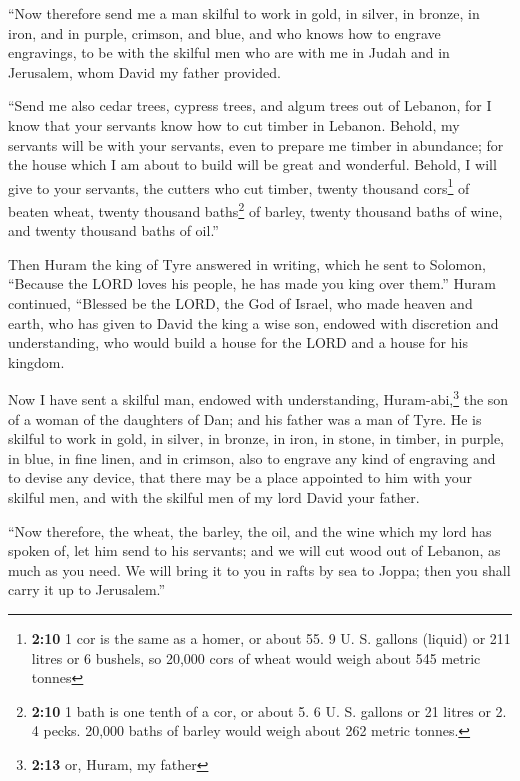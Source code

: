  ``Now therefore send me a man skilful to work in gold, in
silver, in bronze, in iron, and in purple, crimson, and blue, and who
knows how to engrave engravings, to be with the skilful men who are with
me in Judah and in Jerusalem, whom David my father provided.

 ``Send me also cedar trees, cypress trees, and algum
trees out of Lebanon, for I know that your servants know how to cut
timber in Lebanon. Behold, my servants will be with your servants,
 even to prepare me timber in abundance; for the house
which I am about to build will be great and wonderful. 
Behold, I will give to your servants, the cutters who cut timber, twenty
thousand cors\footnote{\textbf{2:10} 1 cor is the same as a homer, or
  about 55. 9 U. S. gallons (liquid) or 211 litres or 6 bushels, so
  20,000 cors of wheat would weigh about 545 metric tonnes} of beaten
wheat, twenty thousand baths\footnote{\textbf{2:10} 1 bath is one tenth
  of a cor, or about 5. 6 U. S. gallons or 21 litres or 2. 4 pecks.
  20,000 baths of barley would weigh about 262 metric tonnes.} of
barley, twenty thousand baths of wine, and twenty thousand baths of
oil.''

 Then Huram the king of Tyre answered in writing, which
he sent to Solomon, ``Because the LORD loves his people, he has made you
king over them.''  Huram continued, ``Blessed be the
LORD, the God of Israel, who made heaven and earth, who has given to
David the king a wise son, endowed with discretion and understanding,
who would build a house for the LORD and a house for his kingdom.

 Now I have sent a skilful man, endowed with
understanding, Huram-abi,\footnote{\textbf{2:13} or, Huram, my father}
 the son of a woman of the daughters of Dan; and his
father was a man of Tyre. He is skilful to work in gold, in silver, in
bronze, in iron, in stone, in timber, in purple, in blue, in fine linen,
and in crimson, also to engrave any kind of engraving and to devise any
device, that there may be a place appointed to him with your skilful
men, and with the skilful men of my lord David your father.

 ``Now therefore, the wheat, the barley, the oil, and the
wine which my lord has spoken of, let him send to his servants;
 and we will cut wood out of Lebanon, as much as you
need. We will bring it to you in rafts by sea to Joppa; then you shall
carry it up to Jerusalem.''

